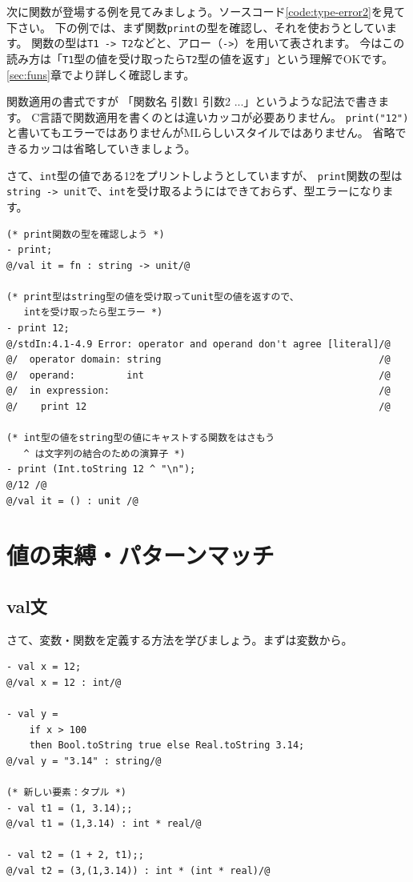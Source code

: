 \documentclass[11pt,a4paper]{article}
\begin{document}
次に関数が登場する例を見てみましょう。ソースコード\ref{code:type-error2}を見て下さい。
下の例では、まず関数\lstinline{print}の型を確認し、それを使おうとしています。
関数の型は\lstinline{T1 -> T2}などと、アロー（\lstinline{->}）を用いて表されます。
今はこの読み方は「\lstinline{T1}型の値を受け取ったら\lstinline{T2}型の値を返す」という理解でOKです。
\ref{sec:funs}章でより詳しく確認します。

関数適用の書式ですが 「関数名 引数1 引数2 ...」というような記法で書きます。
C言語で関数適用を書くのとは違いカッコが必要ありません。
\lstinline{print("12")}と書いてもエラーではありませんがMLらしいスタイルではありません。
省略できるカッコは省略していきましょう。

さて、\lstinline{int}型の値である12をプリントしようとしていますが、
\lstinline{print}関数の型は\lstinline{string -> unit}で、\lstinline{int}を受け取るようにはできておらず、型エラーになります。

\begin{lstlisting}[caption=型エラー２,label=code:type-error2]
(* print関数の型を確認しよう *)
- print;
@/val it = fn : string -> unit/@

(* print型はstring型の値を受け取ってunit型の値を返すので、
   intを受け取ったら型エラー *)
- print 12;
@/stdIn:4.1-4.9 Error: operator and operand don't agree [literal]/@
@/  operator domain: string                                      /@
@/  operand:         int                                         /@
@/  in expression:                                               /@
@/    print 12                                                   /@

(* int型の値をstring型の値にキャストする関数をはさもう
   ^ は文字列の結合のための演算子 *)
- print (Int.toString 12 ^ "\n");
@/12 /@
@/val it = () : unit /@
\end{lstlisting}


\section{値の束縛・パターンマッチ}
\subsection{val文}
さて、変数・関数を定義する方法を学びましょう。まずは変数から。
\begin{lstlisting}[caption={val文}, label={code:vals}]
- val x = 12;
@/val x = 12 : int/@

- val y =
    if x > 100
    then Bool.toString true else Real.toString 3.14;
@/val y = "3.14" : string/@

(* 新しい要素：タプル *)
- val t1 = (1, 3.14);;
@/val t1 = (1,3.14) : int * real/@

- val t2 = (1 + 2, t1);;
@/val t2 = (3,(1,3.14)) : int * (int * real)/@
\end{lstlisting}
\end{document}
